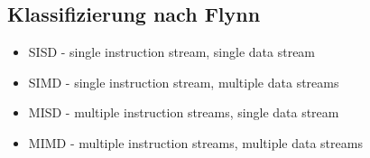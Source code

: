 \subsection{Klassifizierung nach Flynn}
\begin{itemize}
\item SISD - single instruction stream, single data stream
\item SIMD - single instruction stream, multiple data streams
\item MISD - multiple instruction streams, single data stream
\item MIMD - multiple instruction streams, multiple data streams
\end{itemize}
